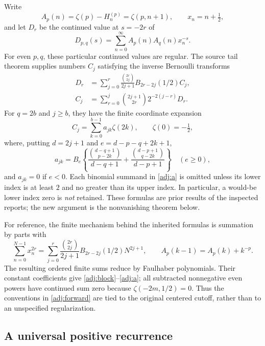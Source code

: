 \documentclass[11pt,a4paper]{article}
\numberwithin{equation}{section}
\theoremstyle{definition}
\theoremstyle{remark}
\begin{document}
Write
\[
 A_p(n)=\zeta(p)-H_n^{(p)}=\zeta(p,n+1),\qquad
 x_n=n+\tfrac12,
\]
and let $D_r$ be the continued value at $s=-2r$ of
\[
 D_{p,q}(s)=\sum_{n=0}^{\infty}A_p(n)A_q(n)x_n^{-s}.
\]
For even $p,q$, these particular continued values are regular.  The
source tail theorem supplies numbers $C_j$ satisfying the inverse
Bernoulli transforms
\begin{align}
 D_r&=\sum_{j=0}^{r}
 \frac{\binom{2r}{2j}}{2j+1}B_{2r-2j}(1/2)C_j,
 \label{adj:forward}\\
 C_j&=\sum_{r=0}^{j}\binom{2j+1}{2r}2^{-2(j-r)}D_r.
 \label{adj:backward}
\end{align}
For $q=2b$ and $j\ge b$, they have the finite coordinate expansion
\begin{equation}\label{adj:block}
 C_j=\sum_{k=0}^{b-1}a_{jk}\zeta(2k),\qquad \zeta(0)=-\tfrac12,
\end{equation}
where, putting $d=2j+1$ and $e=d-p-q+2k+1$,
\begin{equation}\label{adj:a}
 a_{jk}=B_e\left\{
 \frac{\binom{d-q+1}{p-2k}}{d-q+1}
 +\frac{\binom{d-p+1}{q-2k}}{d-p+1}
 \right\}\quad(e\ge0),
\end{equation}
and $a_{jk}=0$ if $e<0$.  Each binomial summand in
\eqref{adj:a} is omitted unless its lower index is at least $2$ and
no greater than its upper index.  In particular, a would-be lower
index zero is \emph{not} retained.  These formulas are prior results
of the inspected reports; the new argument is the nonvanishing theorem
below.

For reference, the finite mechanism behind the inherited formulas is
summation by parts with
\[
 \sum_{n=0}^{N-1}x_n^{2r}
 =\sum_{j=0}^{r}\frac{\binom{2r}{2j}}{2j+1}
 B_{2r-2j}(1/2)N^{2j+1},
 \qquad A_p(k-1)=A_p(k)+k^{-p}.
\]
The resulting ordered finite sums reduce by Faulhaber polynomials.
Their constant coefficients give \eqref{adj:block}--\eqref{adj:a};
all subtracted nonnegative even powers have continued sum zero because
$\zeta(-2m,1/2)=0$.  Thus the conventions in
\eqref{adj:forward} are tied to the original centered cutoff, rather
than to an unspecified regularization.

\subsection{A universal positive recurrence}
\end{document}
